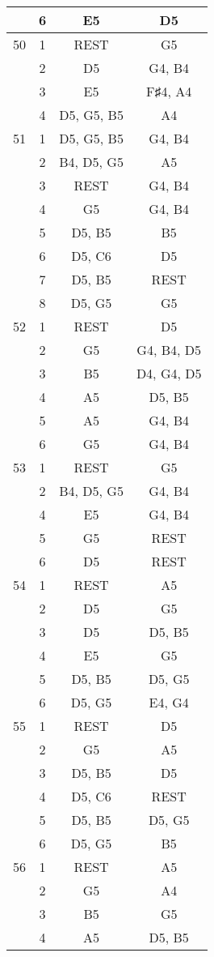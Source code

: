 \documentclass{article}
\begin{document}
\begin{longtable}{|c|c|c|c|}
  & 6 & E5 & D5 \\ 
\hline
50 & 1 & REST & G5 \\ 
  & 2 & D5 & G4, B4 \\ 
  & 3 & E5 & F♯4, A4 \\ 
  & 4 & D5, G5, B5 & A4 \\ 
\hline
51 & 1 & D5, G5, B5 & G4, B4 \\ 
  & 2 & B4, D5, G5 & A5 \\ 
  & 3 & REST & G4, B4 \\ 
  & 4 & G5 & G4, B4 \\ 
  & 5 & D5, B5 & B5 \\ 
  & 6 & D5, C6 & D5 \\ 
  & 7 & D5, B5 & REST \\ 
  & 8 & D5, G5 & G5 \\ 
\hline
52 & 1 & REST & D5 \\ 
  & 2 & G5 & G4, B4, D5 \\ 
  & 3 & B5 & D4, G4, D5 \\ 
  & 4 & A5 & D5, B5 \\ 
  & 5 & A5 & G4, B4 \\ 
  & 6 & G5 & G4, B4 \\ 
\hline
53 & 1 & REST & G5 \\ 
  & 2 & B4, D5, G5 & G4, B4 \\ 
  & 4 & E5 & G4, B4 \\ 
  & 5 & G5 & REST \\ 
  & 6 & D5 & REST \\ 
\hline
54 & 1 & REST & A5 \\ 
  & 2 & D5 & G5 \\ 
  & 3 & D5 & D5, B5 \\ 
  & 4 & E5 & G5 \\ 
  & 5 & D5, B5 & D5, G5 \\ 
  & 6 & D5, G5 & E4, G4 \\ 
\hline
55 & 1 & REST & D5 \\ 
  & 2 & G5 & A5 \\ 
  & 3 & D5, B5 & D5 \\ 
  & 4 & D5, C6 & REST \\ 
  & 5 & D5, B5 & D5, G5 \\ 
  & 6 & D5, G5 & B5 \\ 
\hline
56 & 1 & REST & A5 \\ 
  & 2 & G5 & A4 \\ 
  & 3 & B5 & G5 \\ 
  & 4 & A5 & D5, B5 \\ 

\end{longtable}
\end{document}

